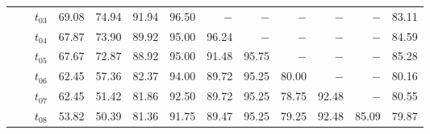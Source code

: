 \begin{table}[ht]
\begin{tabular}{@{}l l l *{10}{r}@{}}
 & & $t_{03}$ & 69.08 & 74.94 & 91.94 & 96.50 & $-$ & $-$ & $-$ & $-$ & $-$ & 83.11 \\
 & & $t_{04}$ & 67.87 & 73.90 & 89.92 & 95.00 & 96.24 & $-$ & $-$ & $-$ & $-$ & 84.59 \\
 & & $t_{05}$ & 67.67 & 72.87 & 88.92 & 95.00 & 91.48 & 95.75 & $-$ & $-$ & $-$ & 85.28 \\
 & & $t_{06}$ & 62.45 & 57.36 & 82.37 & 94.00 & 89.72 & 95.25 & 80.00 & $-$ & $-$ & 80.16 \\
 & & $t_{07}$ & 62.45 & 51.42 & 81.86 & 92.50 & 89.72 & 95.25 & 78.75 & 92.48 & $-$ & 80.55 \\
 & & $t_{08}$ & 53.82 & 50.39 & 81.36 & 91.75 & 89.47 & 95.25 & 79.25 & 92.48 & 85.09 & 79.87 \\
\bottomrule
\end{tabular}
\end{table}

